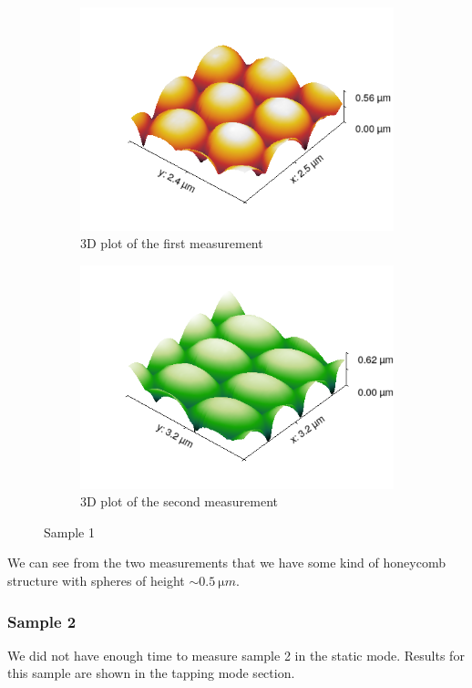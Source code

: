 \documentclass[11pt,a4paper]{article}
\begin{document}
\begin{figure}[H]
\begin{subfigure}[b]{0.45\textwidth}
\includegraphics[width=\textwidth]{sm_sample1_3D}
\caption{3D plot of the first measurement}
\label{fig:}
\end{subfigure}
\begin{subfigure}[b]{0.45\textwidth}
\includegraphics[width=\textwidth]{sm_sample1_dir2_3D}
\caption{3D plot of the second measurement}
\label{fig:}
\end{subfigure}
\caption{Sample 1}
\end{figure}

We can see from the two measurements that we have some kind of honeycomb structure with spheres of height $\sim\SI{0.5}{\micro m}$.

\subsubsection{Sample 2}
We did not have enough time to measure sample 2 in the static mode. Results for this sample are shown in the tapping mode section.
\end{document}

